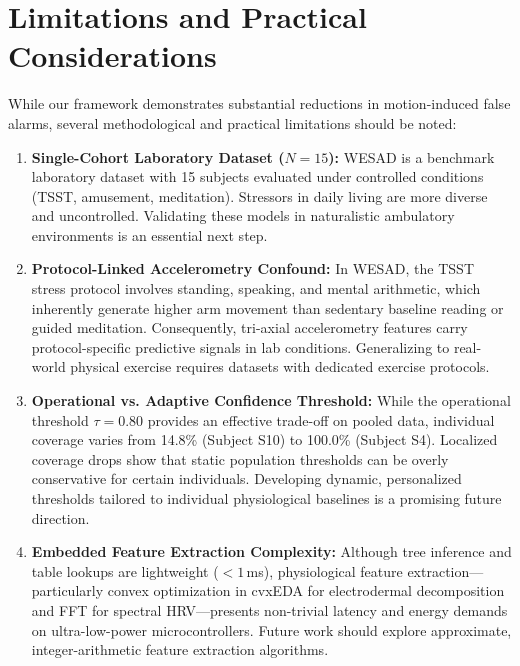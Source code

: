 \documentclass[conference]{IEEEtran}
\begin{document}
\section{Limitations and Practical Considerations}
While our framework demonstrates substantial reductions in motion-induced false alarms, several methodological and practical limitations should be noted:
\begin{enumerate}
    \item \textbf{Single-Cohort Laboratory Dataset ($N=15$):} WESAD is a benchmark laboratory dataset with 15 subjects evaluated under controlled conditions (TSST, amusement, meditation). Stressors in daily living are more diverse and uncontrolled. Validating these models in naturalistic ambulatory environments is an essential next step.
    \item \textbf{Protocol-Linked Accelerometry Confound:} In WESAD, the TSST stress protocol involves standing, speaking, and mental arithmetic, which inherently generate higher arm movement than sedentary baseline reading or guided meditation. Consequently, tri-axial accelerometry features carry protocol-specific predictive signals in lab conditions. Generalizing to real-world physical exercise requires datasets with dedicated exercise protocols.
    \item \textbf{Operational vs. Adaptive Confidence Threshold:} While the operational threshold $\tau = 0.80$ provides an effective trade-off on pooled data, individual coverage varies from 14.8\% (Subject S10) to 100.0\% (Subject S4). Localized coverage drops show that static population thresholds can be overly conservative for certain individuals. Developing dynamic, personalized thresholds tailored to individual physiological baselines is a promising future direction.
    \item \textbf{Embedded Feature Extraction Complexity:} Although tree inference and table lookups are lightweight ($< 1$\,ms), physiological feature extraction—particularly convex optimization in cvxEDA for electrodermal decomposition and FFT for spectral HRV—presents non-trivial latency and energy demands on ultra-low-power microcontrollers. Future work should explore approximate, integer-arithmetic feature extraction algorithms.
\end{enumerate}

\end{document}
